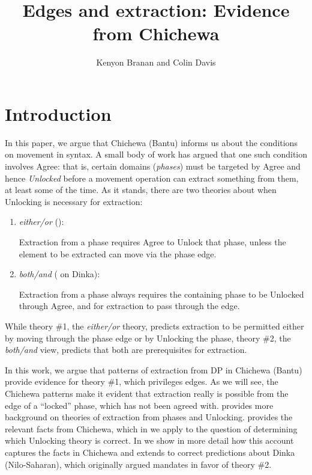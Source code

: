 \documentclass[output=paper,colorlinks,citecolor=brown]{langscibook}
\title{Edges and extraction: Evidence from Chichewa}
\author{Kenyon Branan\affiliation{MIT} and Colin Davis\affiliation{MIT}}
\begin{document}
\maketitle 

\section{Introduction}\label{sec:branan:1}

In this paper, we argue that Chichewa (Bantu) informs us about the conditions on movement in syntax. A small body of work has argued that one such condition involves Agree: that is, certain domains (\textit{phases}) must be targeted by Agree and hence \textit{Unlocked} before a movement operation can extract something from them, at least some of the time. As it stands, there are two theories about when Unlocking is necessary for extraction:

\begin{enumerate}
\item \textit{either/or} (\citealt{RackowskiRichards2005, Halpert2016, Halpert2019, Branan2018}):

    Extraction from a phase requires Agree to Unlock that phase, unless the element to be extracted can move via the phase edge.

\item \textit{both/and} (\citealt{VanUrkRichards2015} on Dinka):

    Extraction from a phase always requires the containing phase to be Unlocked through Agree, and for extraction to pass through the edge.
\end{enumerate}

While theory \#1, the \emph{either/or} theory, predicts extraction to be permitted either by moving through the phase edge or by Unlocking the phase, theory \#2, the \emph{both/and} view, predicts that both are prerequisites for extraction.

In this work, we argue that patterns of extraction from DP in Chichewa (Bantu) provide evidence for theory \#1, which privileges edges. As we will see, the Chichewa patterns make it evident that extraction really is possible from the edge of a “locked” phase, which has not been agreed with.
 provides more background on theories of extraction from phases and Unlocking.  provides the relevant facts from Chichewa, which in  we apply to the question of determining which Unlocking theory is correct. In  we show in more detail how this account captures the facts in Chichewa and extends to correct predictions about Dinka (Nilo-Saharan), which \citeauthor{VanUrkRichards2015} originally argued mandates in favor of theory \#2.
\end{document}
